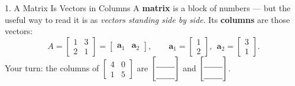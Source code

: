 \documentclass[10pt]{article}
\begin{document}
\begin{notesbox}{1. A Matrix Is Vectors in Columns}
A \textbf{matrix} is a block of numbers --- but the useful way to read it is as \emph{vectors
standing side by side}. Its \textbf{columns} are those vectors:
\[
  A=\begin{bmatrix} 1 & 3 \\ 2 & 1 \end{bmatrix}
  =\begin{bmatrix} \mathbf{a}_1 & \mathbf{a}_2 \end{bmatrix},
  \qquad
  \mathbf{a}_1=\begin{bmatrix} 1 \\ 2 \end{bmatrix},\ \
  \mathbf{a}_2=\begin{bmatrix} 3 \\ 1 \end{bmatrix}.
\]
Your turn: the columns of $\begin{bmatrix} 4 & 0 \\ 1 & 5 \end{bmatrix}$ are
$\begin{bmatrix}\rule{0pt}{1.1em}\blank{0.8cm}\\[2pt]\blank{0.8cm}\end{bmatrix}$ and
$\begin{bmatrix}\rule{0pt}{1.1em}\blank{0.8cm}\\[2pt]\blank{0.8cm}\end{bmatrix}$.
\end{notesbox}
\end{document}
